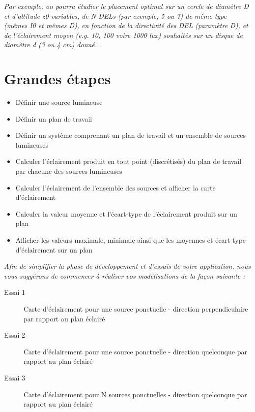 \medskip

\textit{Par exemple, on pourra étudier le placement optimal sur un cercle de diamètre D et d'altitude z0 variables, de N DELs (par exemple, 5 ou 7) de même type (mêmes I0 et mêmes D), en fonction de la directivité des DEL (paramètre D), et de l'éclairement moyen (e.g. 10, 100 voire 1000 lux) souhaités sur un disque de diamètre d (3 ou 4 cm) donné... }


\section{Grandes étapes}

\begin{itemize}
	\item Définir une source lumineuse
	\item Définir un plan de travail
	\item Définir un système comprenant un plan de travail et un ensemble de sources lumineuses
	\item Calculer l'éclairement produit en tout point (discrétisés) du plan de travail par chacune des sources lumineuses
	\item Calculer l'éclairement de l'ensemble des sources et afficher la carte d'éclairement
	\item Calculer la valeur moyenne et l'écart-type de l'éclairement produit sur un plan
	\item Afficher les valeurs maximale, minimale ainsi que les moyennes et écart-type d'éclairement sur un plan
\end{itemize}

\medskip

\textit{Afin de simplifier la phase de développement et d'essais de votre application, nous vous suggérons de commencer à réaliser vos modélisations de la façon suivante : }

\begin{description}
	\item[Essai 1] Carte d'éclairement pour une source ponctuelle - direction perpendiculaire par rapport au plan éclairé
	\item[Essai 2] Carte d'éclairement pour une source ponctuelle - direction quelconque par rapport au plan éclairé
	\item[Essai 3] Carte d'éclairement pour N sources ponctuelles - direction quelconque par rapport au plan éclairé
\end{description}

